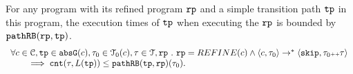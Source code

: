 \begin{lemma}
  For any program with its refined program $\mathtt{rp}$ and a simple transition path $\mathtt{tp}$ in this program,
  the execution times of $\mathtt{tp}$ when executing the $\mathtt{rp}$ is bounded by $\mathtt{pathRB}(\mathtt{rp}, \mathtt{tp})$.
  \[
    \begin{array}{l}
    \forall c \in \mathcal{C}, \mathtt{tp} \in \mathtt{abs}{\mathtt{G}}(c), \mathtt{\tau}_0 \in \mathcal{T}_0(c), \mathtt{\tau} \in \mathcal{T}, \mathtt{rp} ~.~ 
    \mathtt{rp} = REFINE(c)
    \land
    \langle c, \mathtt{\tau}_0 \rangle \to^* 
    \langle {\ensuremath{\mathtt{skip}}, \ensuremath{\mathtt{\tau}}_0 {\scriptscriptstyle ++}\ensuremath{\mathtt{\tau}}} \rangle
    \\ \qquad
    \implies
    \mathtt{cnt}(\mathtt{\tau}, L(\mathtt{tp})) \leq \mathtt{pathRB}(\mathtt{tp}, \mathtt{rp})(\mathtt{\tau}_0).
    \end{array}
    \]
\end{lemma}
%
